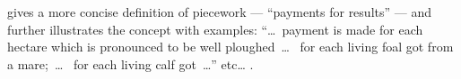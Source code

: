 \documentclass[trackingWork]{subfiles}
\begin{document}
\citeauthor{10.2307/2338394} gives a more concise definition of piecework
--- ``payments for results'' --- and further illustrates the concept with examples:
``\dots~payment is made for each hectare which is pronounced to be well ploughed~\dots~
for each living foal got from a mare;~\dots~
for each living calf got~\dots'' etc\dots
\cite{10.2307/2338394}.




\onlyinsubfile{
  \printbibliography
  \clearpage
  }
\end{document}
